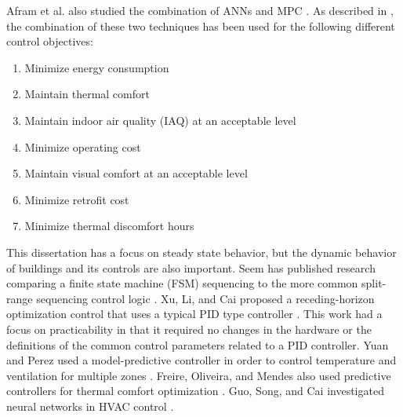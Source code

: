 Afram et al. also studied the combination of ANNs and MPC
\cite{Afram2017}. As described in \cite{Afram2017}, the combination of
these two techniques has been used for the following different control
objectives:

\begin{enumerate}
    \item Minimize energy consumption \cite{Ferreira2012, Huang2015a, Kusiak2011OptimizationOfAnHVACSystemWithAStrength, Kusiak2014MinimizationOfEnergyConsumptionInHVAC,WeiXiupeng2015, Garnier2015, Kim2016, LuLu2005HVACSystemOptimization, Ning2010Neuro-optimalSystem}
    \item Maintain thermal comfort \cite{Ferreira2012, Kusiak2011OptimizationOfAnHVACSystemWithAStrength, Kusiak2014MinimizationOfEnergyConsumptionInHVAC, WeiXiupeng2015, Garnier2015, Kim2016}
    \item Maintain indoor air quality (IAQ) at an acceptable level \cite{Kusiak2011MultiObjective}
    \item Minimize operating cost \cite{Garnier2015, Lee2015, Huang2015a, Ruano2015, Ruano2016}
    \item Maintain visual comfort at an acceptable level \cite{Kim2016}
    \item Minimize retrofit cost \cite{Asadi2014a}
    \item Minimize thermal discomfort hours \cite{Asadi2014a}
\end{enumerate}

This dissertation has a focus on steady state behavior, but the dynamic
behavior of buildings and its controls are also important. Seem has
published research comparing a finite state machine (FSM) sequencing to
the more common split-range sequencing control logic \cite{Seem1999}.
Xu, Li, and Cai proposed a receding-horizon optimization control that
uses a typical PID type controller \cite{XuMin2005}. This work had a
focus on practicability in that it required no changes in the hardware
or  the definitions of the common control parameters related to a PID
controller. Yuan and Perez used a model-predictive controller in order
to control temperature and ventilation for multiple zones
\cite{Yuan2006Multiple-zoneStrategy}. Freire, Oliveira, and Mendes also
used predictive controllers for thermal comfort optimization
\cite{Freire2008PredictiveSavings}.  Guo, Song, and Cai investigated
neural networks in HVAC control \cite{Guo2007}.
